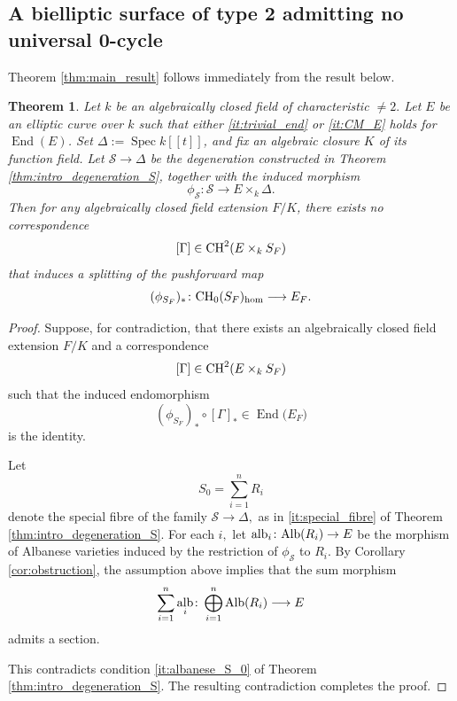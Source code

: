 \documentclass[11pt,letterpaper]{amsart}
\newcommand{\Alb}{\textnormal{Alb}}
\newcommand{\CH}{\textnormal{CH}}
\newcommand{\ca}[1]{{\mathcal{#1}}}
\numberwithin{equation}{section}
\newtheorem{theorem}{Theorem}[section]
\theoremstyle{definition}
\theoremstyle{remark}
\DeclareMathOperator{\al}{alb}
\DeclareMathOperator{\End}{End}
\DeclareMathOperator{\Spec}{Spec}
\begin{document}
\subsection{A bielliptic surface of type 2 admitting no universal 0-cycle} 
Theorem \ref{thm:main_result} follows immediately from the result below.
\begin{theorem}\label{thm:main_result_body}
Let $k$ be an algebraically closed field of characteristic $\neq 2.$ Let $E$ be an elliptic curve over $k$ such that either \ref{it:trivial_end} or \ref{it:CM_E} holds for $\End(E)$. Set $\Delta := \Spec k[[t]]$, and fix an algebraic closure $K$ of its function field. Let $\mathcal S \to \Delta$ be the degeneration constructed in Theorem \ref{thm:intro_degeneration_S}, together with the induced morphism
$$
\phi_{\mathcal S} \colon \mathcal S \longrightarrow E \times_k \Delta .
$$
Then for any algebraically closed field extension $F/K$, there exists no correspondence
$$
[\Gamma] \in \CH^{2}(E \times_k S_F)
$$
that induces a splitting of the pushforward map
\begin{equation*}
(\phi_{S_F})_{\ast} \colon \CH_0(S_F)_{\hom} \longrightarrow E_{F} .
\end{equation*}
\end{theorem}
\begin{proof} Suppose, for contradiction, that there exists an algebraically closed field extension $F/K$ and a correspondence
$$
[\Gamma] \in \CH^{2}(E \times_k S_F)
$$
such that the induced endomorphism $$(\phi_{S_F})_{\ast}\circ[\Gamma]_{\ast}\in\End\bigl(E_{F}\bigr)$$ is the identity.\par
Let $$S_0=\sum_{i=1}^nR_i$$ denote the special fibre of the family $\ca S\to\Delta,$ as in \eqref{it:special_fibre} of Theorem \ref{thm:intro_degeneration_S}. For each $i,$ let $\al_i\colon\Alb(R_i)\to E$ be the morphism of Albanese varieties induced by the restriction of $\phi_{\mathcal S}$ to $R_i$. By Corollary \ref{cor:obstruction}, the assumption above implies that the sum morphism 
$$\sum_{i=1}^n\al_i\colon\bigoplus_{i=1}^n\Alb(R_i)\longrightarrow E$$
admits a section. \par
This contradicts condition \eqref{it:albanese_S_0} of Theorem \ref{thm:intro_degeneration_S}. The resulting contradiction completes the proof.
\end{proof}
\end{document}
